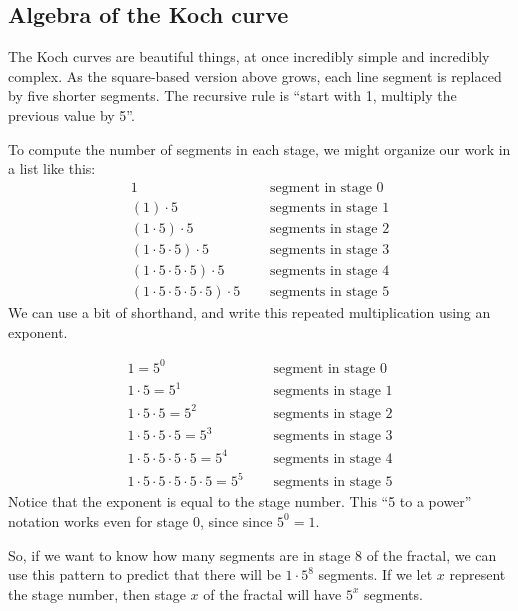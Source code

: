 \subsection{Algebra of the {K}och curve}

The Koch curves are beautiful things, at once incredibly simple and incredibly complex. As the square-based version above grows, each line segment is replaced by five shorter segments. The recursive rule is ``start with 1, multiply the previous value by 5''.

To compute the number of segments in each stage, we might organize our work in a list like this:
\[\begin{aligned}
1 & \quad\text{ segment in stage 0}
\\
(1) \cdot 5 & \quad\text{ segments in stage 1}
\\
(1 \cdot 5) \cdot 5 & \quad\text{ segments in stage 2}
\\
(1 \cdot 5 \cdot 5) \cdot 5 & \quad\text{ segments in stage 3}
\\
(1 \cdot 5 \cdot 5 \cdot 5) \cdot 5 & \quad\text{ segments in stage 4}
\\
(1 \cdot 5 \cdot 5 \cdot 5 \cdot 5) \cdot 5 & \quad\text{ segments in stage 5}
\end{aligned}\]
We can use a bit of shorthand, and write this repeated multiplication using an exponent.

\[\begin{aligned}
1 =5^0& \quad\text{ segment in stage 0}
\\
1 \cdot 5 =5^1& \quad\text{ segments in stage 1}
\\
1 \cdot 5 \cdot 5 =5^2& \quad\text{ segments in stage 2}
\\
1 \cdot 5 \cdot 5 \cdot 5 =5^3& \quad\text{ segments in stage 3}
\\
1 \cdot 5 \cdot 5 \cdot 5 \cdot 5 =5^4& \quad\text{ segments in stage 4}
\\
1 \cdot 5 \cdot 5 \cdot 5 \cdot 5 \cdot 5 =5^5& \quad\text{ segments in stage 5}
\end{aligned}\]
Notice that the exponent is equal to the stage number. This ``5 to a power'' notation works even for stage 0, since since $5^{0} = 1$.

So, if we want to know how many segments are in stage 8 of the fractal, we can use this pattern to predict that there will be $1\cdot 5^8$ segments. If we let $x$ represent the stage number, then stage $x$ of the fractal will have $5^x$ segments.

